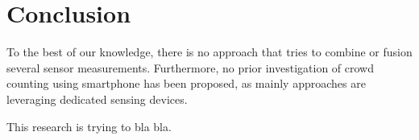 \chapter{Conclusion}\label{ch:conclusion} %
To the best of our knowledge, there is no approach that tries to combine or fusion several sensor measurements. Furthermore, no prior investigation of crowd counting using smartphone has been proposed, as mainly approaches are leveraging dedicated sensing devices.

This research is trying to bla bla.
